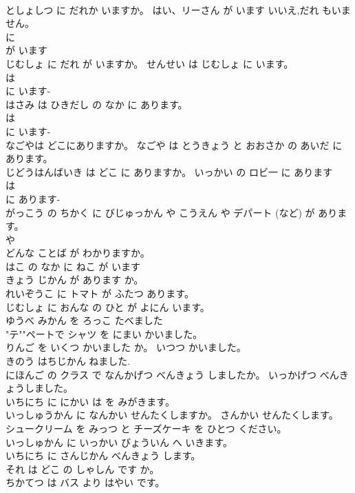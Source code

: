 \documentclass[8pt]{extreport}
\begin{document}
\begin{CJK}{UTF8}{min}
\\	としょしつ に だれか いますか。 はい、リーさん が います いいえ,だれ もいません。	
\\	に 
\\	が います
\\	じむしょ に だれ が いますか。 せんせい は じむしょ に います。	
\\	は 
\\	に います- 
\\	はさみ は ひきだし の なか に あります。	
\\	は 
\\	に います- 
\\	なごやは どこにありますか。 なごや は とうきょう と おおさか の あいだ に あります。	
\\	じどうはんばいき は どこ に ありますか。 いっかい の ロビ一 に あります	
\\	は 
\\	に あります- 
\\	がっこう の ちかく に びじゅっかん や こうえん や デパート (など) が あります。	
\\	や 
\\	どんな ことば が わかりますか。	
\\	はこ の なか に ねこ が います	
\\	きょう じかん が あります か。	
\\	れいぞうこ に トマト が ふたつ あります。	
\\	じむしょ に おんな の ひと が よにん います。	
\\	ゆうべ みかん を ろっこ たべました	
\\	"テ""ペートで シャツ を にまい かいました。
\\	りんご を いくつ かいました か。 いつつ かいました。	
\\	きのう はちじかん ねました.	
\\	にほんご の クラス で なんかげつ べんきょう しましたか。 いっかげつ べんきょうしました。	
\\	いちにち に にかい は を みがきます。	
\\	いっしゅうかん に なんかい せんたくしますか。 さんかい せんたくします。	
\\	シュークリーム を みっつ と チーズケーキ を ひとつ ください。	
\\	いっしゅかん に いっかい びょういん へ いきます。	
\\	いちにち に さんじかん べんきょう します。	
\\	それ は どこ の しゃしん です か。	
\\	ちかてつ は バス より はやい です。	

\end{CJK}
\end{document}
